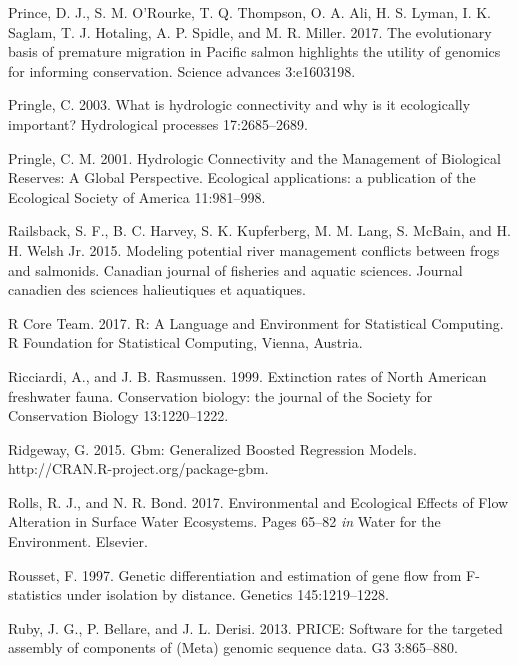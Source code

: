 \documentclass[proquest,12pt,final]{ucthesis-CA2012} %
\begin{document}
\begin{ucmainmatter}
\leavevmode\hypertarget{ref-prince_evolutionary_2017}{}%
Prince, D. J., S. M. O'Rourke, T. Q. Thompson, O. A. Ali, H. S. Lyman,
I. K. Saglam, T. J. Hotaling, A. P. Spidle, and M. R. Miller. 2017. The
evolutionary basis of premature migration in Pacific salmon highlights
the utility of genomics for informing conservation. Science advances
3:e1603198.

\leavevmode\hypertarget{ref-pringle_what_2003}{}%
Pringle, C. 2003. What is hydrologic connectivity and why is it
ecologically important? Hydrological processes 17:2685--2689.

\leavevmode\hypertarget{ref-pringle_hydrologic_2001}{}%
Pringle, C. M. 2001. Hydrologic Connectivity and the Management of
Biological Reserves: A Global Perspective. Ecological applications: a
publication of the Ecological Society of America 11:981--998.

\leavevmode\hypertarget{ref-railsback_modeling_2015}{}%
Railsback, S. F., B. C. Harvey, S. K. Kupferberg, M. M. Lang, S. McBain,
and H. H. Welsh Jr. 2015. Modeling potential river management conflicts
between frogs and salmonids. Canadian journal of fisheries and aquatic
sciences. Journal canadien des sciences halieutiques et aquatiques.

\leavevmode\hypertarget{ref-r_core_team_r_2017}{}%
R Core Team. 2017. R: A Language and Environment for Statistical
Computing. R Foundation for Statistical Computing, Vienna, Austria.

\leavevmode\hypertarget{ref-ricciardi_extinction_1999}{}%
Ricciardi, A., and J. B. Rasmussen. 1999. Extinction rates of North
American freshwater fauna. Conservation biology: the journal of the
Society for Conservation Biology 13:1220--1222.

\leavevmode\hypertarget{ref-ridgeway_gbm_2015}{}%
Ridgeway, G. 2015. Gbm: Generalized Boosted Regression Models.
http://CRAN.R-project.org/package-gbm.

\leavevmode\hypertarget{ref-rolls_environmental_2017}{}%
Rolls, R. J., and N. R. Bond. 2017. Environmental and Ecological Effects
of Flow Alteration in Surface Water Ecosystems. Pages 65--82 \emph{in}
Water for the Environment. Elsevier.

\leavevmode\hypertarget{ref-rousset_genetic_1997}{}%
Rousset, F. 1997. Genetic differentiation and estimation of gene flow
from F-statistics under isolation by distance. Genetics 145:1219--1228.

\leavevmode\hypertarget{ref-ruby_price_2013}{}%
Ruby, J. G., P. Bellare, and J. L. Derisi. 2013. PRICE: Software for the
targeted assembly of components of (Meta) genomic sequence data. G3
3:865--880.


\end{ucmainmatter}
\end{document}
